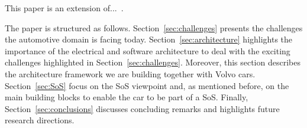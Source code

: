 This paper is an extension of...~\cite{Pelliccione2017_SoS}.

The paper is structured as follows. Section~\ref{sec:challenges} presents the challenges the automotive domain is facing today.  Section~\ref{sec:architecture} highlights the importance of the electrical and software architecture to deal with the exciting challenges highlighted in Section~\ref{sec:challenges}. Moreover, this section describes the architecture framework we are building together with Volvo cars. Section~\ref{sec:SoS} focus on the SoS viewpoint and, as mentioned before, on the main building blocks to enable the car to be part of a SoS. 
Finally, Section~\ref{sec:conclusions} discusses concluding remarks and highlights future research directions.